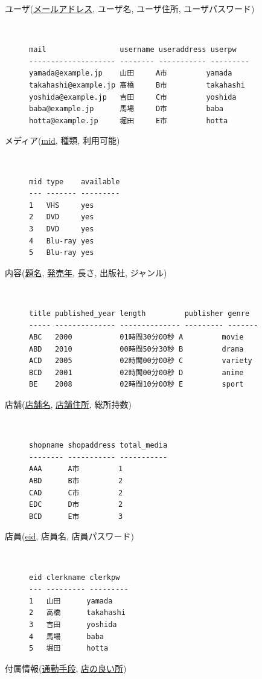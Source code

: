 \documentclass{jarticle}
\begin{document}
\begin{description}
\item[ユーザ(\underline{メールアドレス}, ユーザ名, ユーザ住所, ユーザパスワード)] \leavevmode \\
\begin{verbatim}
mail                 username useraddress userpw
-------------------- -------- ----------- ---------
yamada@example.jp    山田     A市         yamada
takahashi@example.jp 高橋     B市         takahashi
yoshida@example.jp   吉田     C市         yoshida
baba@example.jp      馬場     D市         baba
hotta@example.jp     堀田     E市         hotta
\end{verbatim}
\item[メディア(\underline{mid}, 種類, 利用可能)] \leavevmode \\
\begin{verbatim}
mid type    available
--- ------- ---------
1   VHS     yes
2   DVD     yes
3   DVD     yes
4   Blu-ray yes
5   Blu-ray yes
\end{verbatim}
\item[内容(\underline{題名}, \underline{発売年}, 長さ, 出版社, ジャンル)] \leavevmode \\
\begin{verbatim}
title published_year length         publisher genre
----- -------------- -------------- --------- -------
ABC   2000           01時間30分00秒 A         movie
ABD   2010           00時間50分30秒 B         drama
ACD   2005           02時間00分00秒 C         variety
BCD   2001           02時間00分00秒 D         anime
BE    2008           02時間10分00秒 E         sport
\end{verbatim}
\item[店舗(\underline{店舗名}, \underline{店舗住所}, 総所持数)] \leavevmode \\
\begin{verbatim}
shopname shopaddress total_media
-------- ----------- -----------
AAA      A市         1
ABD      B市         2
CAD      C市         2
EDC      D市         2
BCD      E市         3
\end{verbatim}
\item[店員(\underline{eid}, 店員名, 店員パスワード)] \leavevmode \\
\begin{verbatim}
eid clerkname clerkpw
--- --------- ---------
1   山田      yamada
2   高橋      takahashi
3   吉田      yoshida
4   馬場      baba
5   堀田      hotta
\end{verbatim}
\item[付属情報(\underline{通勤手段}, \underline{店の良い所})] \leavevmode \\

\end{description}
\end{document}
